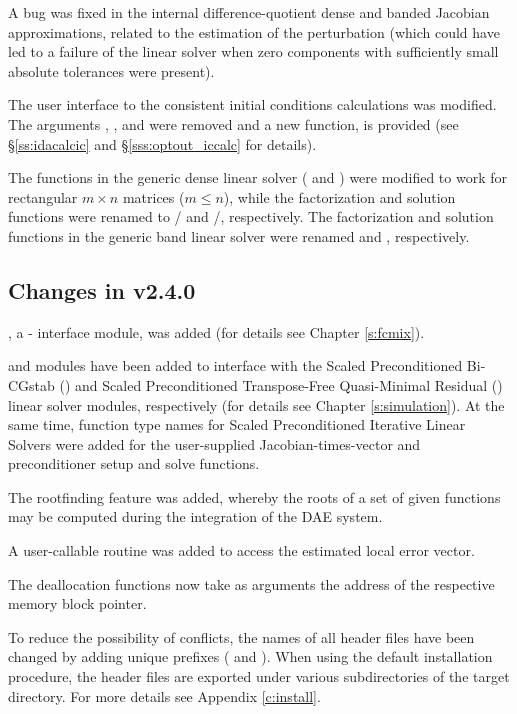 A bug was fixed in the internal difference-quotient dense and banded
Jacobian approximations, related to the estimation of the perturbation
(which could have led to a failure of the linear solver when zero
components with sufficiently small absolute tolerances were present).

The user interface to the consistent initial conditions calculations was modified. 
The  arguments , , and  were removed and 
a new function,  is provided (see \S\ref{ss:idacalcic} and 
\S\ref{sss:optout_iccalc} for details).

The functions in the generic dense linear solver ( and
) were modified to work for rectangular $m \times n$
matrices ($m \le n$), while the factorization and solution functions were
renamed to / and /, 
respectively.
The factorization and solution functions in the generic band linear solver were 
renamed  and , respectively.

\subsection*{Changes in v2.4.0}

{\fida}, a {\F}-{\CC} interface module, was added (for details see Chapter
\ref{s:fcmix}).

{\idaspbcg} and {\idasptfqmr} modules have been added to interface with the
Scaled Preconditioned Bi-CGstab ({\spbcg}) and Scaled Preconditioned
Transpose-Free Quasi-Minimal Residual ({\sptfqmr}) linear solver modules,
respectively (for details see Chapter \ref{s:simulation}).
At the same time, function type names for Scaled Preconditioned Iterative
Linear Solvers were added for the user-supplied Jacobian-times-vector and
preconditioner setup and solve functions.

The rootfinding feature was added, whereby the roots of a set of given
functions may be computed during the integration of the DAE system.

A user-callable routine was added to access the estimated local error
vector.

The deallocation functions now take as arguments the address of the respective 
memory block pointer.

To reduce the possibility of conflicts, the names of all header files have
been changed by adding unique prefixes ( and ).
When using the default installation procedure, the header files are exported
under various subdirectories of the target  directory. For more
details see Appendix \ref{c:install}.

